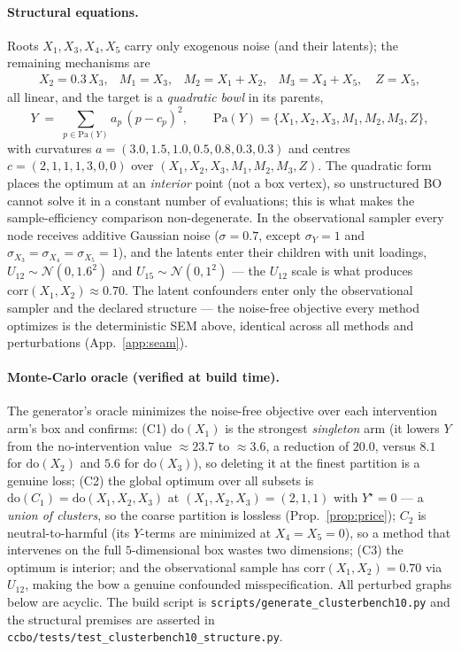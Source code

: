 \documentclass[twoside]{article}
\newcommand{\doo}{\mathrm{do}}
\newcommand{\Pa}{\mathrm{Pa}}
\newcommand{\BO}{\textsc{BO}}
\begin{document}
\paragraph{Structural equations.}
Roots $X_1,X_3,X_4,X_5$ carry only exogenous noise (and their latents); the remaining
mechanisms are
\[
\begin{array}{llll}
X_2 = 0.3\,X_3, & M_1 = X_3, & M_2 = X_1+X_2, & M_3 = X_4+X_5,\quad Z = X_5,
\end{array}
\]
all linear, and the target is a \emph{quadratic bowl} in its parents,
\[
Y \;=\; \sum_{p\in\Pa(Y)} a_p\,(p-c_p)^2,\qquad
\Pa(Y)=\{X_1,X_2,X_3,M_1,M_2,M_3,Z\},
\]
with curvatures $a=(3.0,1.5,1.0,0.5,0.8,0.3,0.3)$ and centres
$c=(2,1,1,1,3,0,0)$ over $(X_1,X_2,X_3,M_1,M_2,M_3,Z)$. The quadratic form places the
optimum at an \emph{interior} point (not a box vertex), so unstructured \BO{} cannot
solve it in a constant number of evaluations; this is what makes the sample-efficiency
comparison non-degenerate. In the observational sampler every node receives
additive Gaussian noise ($\sigma=0.7$, except $\sigma_Y=1$ and
$\sigma_{X_3}=\sigma_{X_4}=\sigma_{X_5}=1$), and the latents enter their
children with unit loadings, $U_{12}\sim\mathcal{N}(0,1.6^2)$ and
$U_{15}\sim\mathcal{N}(0,1^2)$ --- the $U_{12}$ scale is what produces
$\mathrm{corr}(X_1,X_2)\approx 0.70$. The latent confounders enter only the
observational
sampler and the declared structure --- the noise-free objective every method optimizes
is the deterministic SEM above, identical across all methods and perturbations
(App.~\ref{app:seam}).

\paragraph{Monte-Carlo oracle (verified at build time).}
The generator's oracle minimizes the noise-free objective over each intervention arm's
box and confirms: (C1) $\doo(X_1)$ is the strongest \emph{singleton} arm (it lowers $Y$
from the no-intervention value $\approx 23.7$ to $\approx 3.6$, a reduction of $20.0$,
versus $8.1$ for $\doo(X_2)$ and $5.6$ for $\doo(X_3)$), so deleting it at the finest
partition is a genuine loss; (C2) the global optimum over all subsets is
$\doo(C_1)=\doo(X_1,X_2,X_3)$ at $(X_1,X_2,X_3)=(2,1,1)$ with $Y^\star=0$ --- a
\emph{union of clusters}, so the coarse partition is lossless (Prop.~\ref{prop:price});
$C_2$ is neutral-to-harmful (its $Y$-terms are minimized at $X_4=X_5=0$), so a method
that intervenes on the full $5$-dimensional box wastes two dimensions; (C3) the optimum
is interior; and the observational sample has $\mathrm{corr}(X_1,X_2)=0.70$ via $U_{12}$,
making the bow a genuine confounded misspecification. All perturbed graphs below are
acyclic. The build script is \texttt{scripts/generate\_clusterbench10.py} and the
structural premises are asserted in \texttt{ccbo/tests/test\_clusterbench10\_structure.py}.
\end{document}
